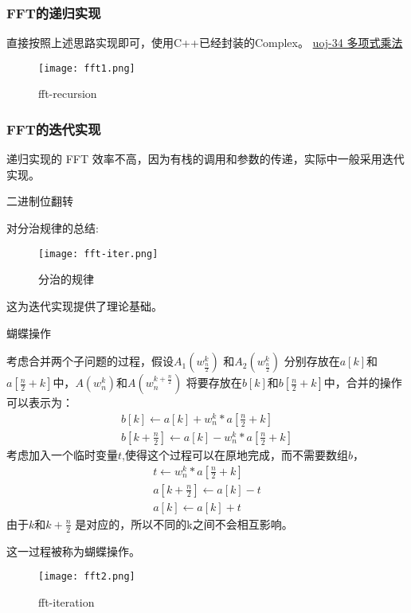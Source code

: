 \subsubsection{FFT的递归实现}
直接按照上述思路实现即可，使用C++已经封装的Complex。
\href{http://uoj.ac/problem/34}{uoj-34 多项式乘法}

\begin{figure}[!htbp]
	\centering
	\texttt{[image: fft1.png]}
	\caption{fft-recursion \label{fig:fft1}}
\end{figure}




\subsubsection{FFT的迭代实现}
递归实现的 FFT 效率不高，因为有栈的调用和参数的传递，实际中一般采用迭代实现。

{\heiti 二进制位翻转}

对分治规律的总结:
\begin{figure}[!htbp]
	\centering
	\texttt{[image: fft-iter.png]}
	\caption{分治的规律 \label{fig:fft-pattern}}
\end{figure}
这为迭代实现提供了理论基础。

{\heiti 蝴蝶操作}

考虑合并两个子问题的过程，假设$A_1(w_{\frac{n}{2}}^k)$ 和$A_2(w_{\frac{n}{2}}^k)$ 分别存放在$a[k]$和$a[\frac{n}{2}+k]$中，$A(w_n^k)$和$A(w_n^{k+\frac{n}{2}})$ 将要存放在$b[k]$和$b[\frac{n}{2}+k]$中，合并的操作可以表示为：
\begin{align*}
b[k]\leftarrow  a[k]+w_n^k*a[\frac{n}{2}+k]  \\
b[k+\frac{n}{2}] \leftarrow a[k]-w_n^k*a[\frac{n}{2}+k]
\end{align*}
考虑加入一个临时变量$t$,使得这个过程可以在原地完成，而不需要数组$b$，	
\begin{align*}
t \leftarrow w_n^k*a[\frac{n}{2}+k]   \\
a[k+\frac{n}{2}] \leftarrow a[k]-t  \\
a[k] \leftarrow a[k]+t
\end{align*}
由于$k$和$k+\frac{n}{2}$ 是对应的，所以不同的k之间不会相互影响。

这一过程被称为蝴蝶操作。

\begin{figure}[!htbp]
	\centering
	\texttt{[image: fft2.png]}
	\caption{fft-iteration \label{fig:fft2}}
\end{figure}

